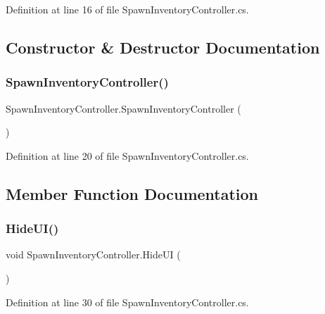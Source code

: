 Definition at line 16 of file Spawn\+Inventory\+Controller.\+cs.



\subsection{Constructor \& Destructor Documentation}
\mbox{\label{class_spawn_inventory_controller_a6446e7323aa90da840b618b875f26848}} 
\subsubsection{\texorpdfstring{Spawn\+Inventory\+Controller()}{SpawnInventoryController()}}
{\footnotesize\ttfamily Spawn\+Inventory\+Controller.\+Spawn\+Inventory\+Controller (\begin{DoxyParamCaption}{ }\end{DoxyParamCaption})}



Definition at line 20 of file Spawn\+Inventory\+Controller.\+cs.



\subsection{Member Function Documentation}
\mbox{\label{class_spawn_inventory_controller_a62257b3a9e83f0acb2d87ac2392fc3f6}} 
\subsubsection{\texorpdfstring{Hide\+U\+I()}{HideUI()}}
{\footnotesize\ttfamily void Spawn\+Inventory\+Controller.\+Hide\+UI (\begin{DoxyParamCaption}{ }\end{DoxyParamCaption})}



Definition at line 30 of file Spawn\+Inventory\+Controller.\+cs.

